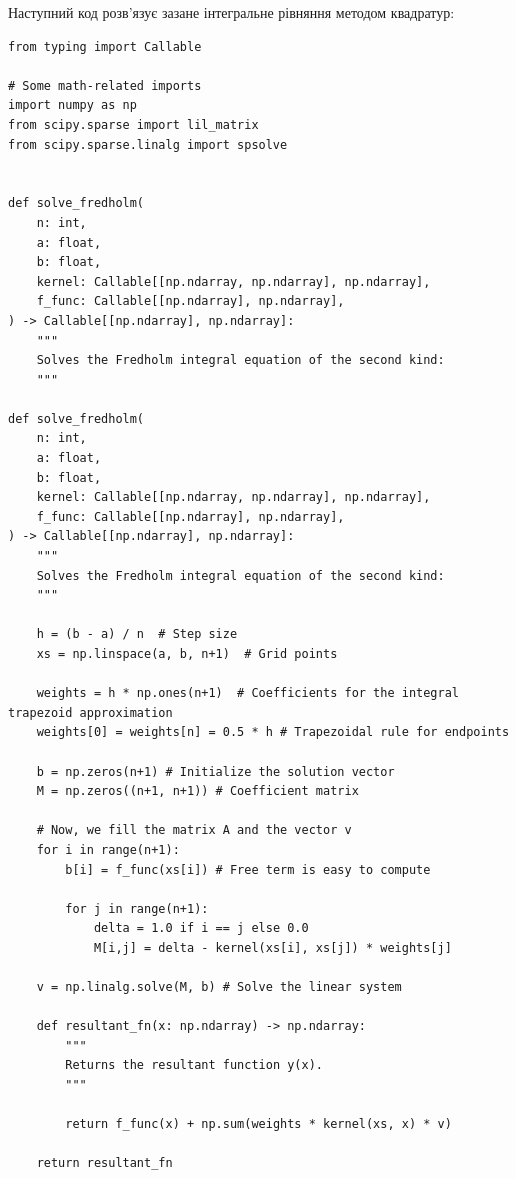 \documentclass[14pt]{extarticle}
\begin{document}
Наступний код розв'язує зазане інтегральне рівняння методом квадратур:
\begin{verbatim}
from typing import Callable

# Some math-related imports
import numpy as np
from scipy.sparse import lil_matrix
from scipy.sparse.linalg import spsolve


def solve_fredholm(
    n: int, 
    a: float, 
    b: float, 
    kernel: Callable[[np.ndarray, np.ndarray], np.ndarray],
    f_func: Callable[[np.ndarray], np.ndarray],
) -> Callable[[np.ndarray], np.ndarray]:
    """
    Solves the Fredholm integral equation of the second kind:
    """
    
def solve_fredholm(
    n: int, 
    a: float, 
    b: float, 
    kernel: Callable[[np.ndarray, np.ndarray], np.ndarray],
    f_func: Callable[[np.ndarray], np.ndarray],
) -> Callable[[np.ndarray], np.ndarray]:
    """
    Solves the Fredholm integral equation of the second kind:
    """
    
    h = (b - a) / n  # Step size
    xs = np.linspace(a, b, n+1)  # Grid points
    
    weights = h * np.ones(n+1)  # Coefficients for the integral trapezoid approximation
    weights[0] = weights[n] = 0.5 * h # Trapezoidal rule for endpoints
    
    b = np.zeros(n+1) # Initialize the solution vector
    M = np.zeros((n+1, n+1)) # Coefficient matrix
    
    # Now, we fill the matrix A and the vector v
    for i in range(n+1):
        b[i] = f_func(xs[i]) # Free term is easy to compute
        
        for j in range(n+1):
            delta = 1.0 if i == j else 0.0
            M[i,j] = delta - kernel(xs[i], xs[j]) * weights[j]

    v = np.linalg.solve(M, b) # Solve the linear system
    
    def resultant_fn(x: np.ndarray) -> np.ndarray:
        """
        Returns the resultant function y(x).
        """
    
        return f_func(x) + np.sum(weights * kernel(xs, x) * v)
    
    return resultant_fn
\end{verbatim}
\end{document}
